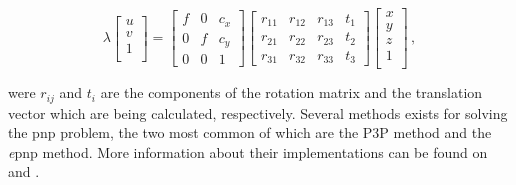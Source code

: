\begin{equation*}
  \lambda
  \begin{bmatrix}
    u \\
    v \\
    1 \\
  \end{bmatrix}
  =
  \begin{bmatrix}
    f & 0 & c_x \\
    0 & f & c_y \\
    0 & 0 & 1
  \end{bmatrix}
  \begin{bmatrix}
    r_{11} & r_{12} & r_{13} & t_1 \\
    r_{21} & r_{22} & r_{23} & t_2 \\
    r_{31} & r_{32} & r_{33} & t_3
  \end{bmatrix}
  \begin{bmatrix}
    x \\
    y \\
    z \\
    1 \\
  \end{bmatrix} \,,
\end{equation*}

were $r_{ij}$ and $t_i$ are the components of the rotation matrix and the translation vector which are being calculated, respectively.
Several methods exists for solving the \acrshort{pnp} problem, the two most common of which are the P3P method and the \textit{e}\acrshort{pnp} method. More information about their implementations can be found on  \cite{XiaoShanGao2003} \cite{Torr2000} and \cite{10.1007/s11263-008-0152-6}.

